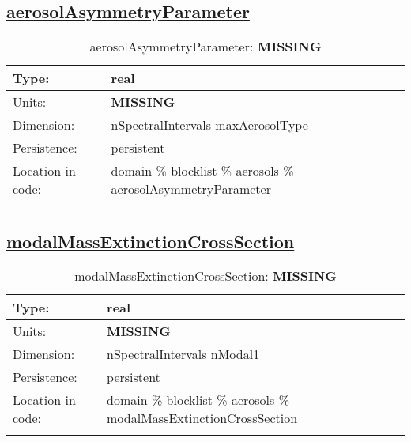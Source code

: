 \subsection[aerosolAsymmetryParameter]{\hyperref[sec:var_tab_aerosols]{aerosolAsymmetryParameter}}
\label{subsec:var_sec_aerosols_aerosolAsymmetryParameter}
\begin{center}
\begin{longtable}{| p{2.0in} | p{4.0in} |}
        \hline 
        Type: & real \\
        \hline 
        Units: & {\bf \color{red} MISSING} \\
        \hline 
        Dimension: & nSpectralIntervals maxAerosolType \\
        \hline 
        Persistence: & persistent \\
        \hline 
         Location in code: & domain \% blocklist \% aerosols \% aerosolAsymmetryParameter \\
         \hline 
    \caption{aerosolAsymmetryParameter: {\bf \color{red} MISSING}}
\end{longtable}
\end{center}
\subsection[modalMassExtinctionCrossSection]{\hyperref[sec:var_tab_aerosols]{modalMassExtinctionCrossSection}}
\label{subsec:var_sec_aerosols_modalMassExtinctionCrossSection}
\begin{center}
\begin{longtable}{| p{2.0in} | p{4.0in} |}
        \hline 
        Type: & real \\
        \hline 
        Units: & {\bf \color{red} MISSING} \\
        \hline 
        Dimension: & nSpectralIntervals nModal1 \\
        \hline 
        Persistence: & persistent \\
        \hline 
         Location in code: & domain \% blocklist \% aerosols \% modalMassExtinctionCrossSection \\
         \hline 
    \caption{modalMassExtinctionCrossSection: {\bf \color{red} MISSING}}
\end{longtable}
\end{center}
